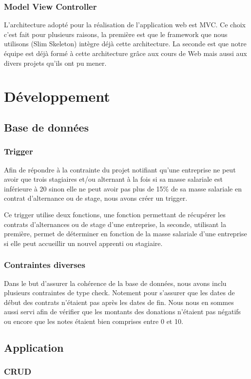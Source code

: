 \documentclass[french,12pt,a4paper,titlepage]{report}
\begin{document}
		\subsection{Model View Controller}
		L'architecture adopté pour la réalisation de l'application web est MVC. Ce choix c'est fait pour plusieurs raisons, la première est que le framework que nous utilisons (Slim Skeleton) intègre déjà cette architecture. La seconde est que notre équipe est déjà formé à cette architecture grâce aux cours de Web mais aussi aux divers projets qu'ils ont pu mener.
	\chapter{Développement}
	\section{Base de données}
	\subsection{Trigger} 
	Afin de répondre à la contrainte du projet notifiant qu'une entreprise ne peut avoir que trois stagiaires et/ou alternant à la fois si sa masse salariale est inférieure à 20 sinon elle ne peut avoir pas plus de 15\% de sa masse salariale en contrat d'alternance ou de stage, nous avons créer un trigger.
	
	Ce trigger utilise deux fonctions, une fonction permettant de récupérer les contrats d'alternances ou de stage d'une entreprise, la seconde, utilisant la première, permet de déterminer en fonction de la masse salariale d'une entreprise si elle peut accueillir un nouvel apprenti ou stagiaire. 
	
	\subsection{Contraintes diverses}
	Dans le but d'assurer la cohérence de la base de données, nous avons inclu plusieurs contraintes de type check. Notement pour s'assurer que les dates de début des contrats n'étaient pas après les dates de fin. Nous nous en sommes aussi servi afin de vérifier que les montants des donations n'étaient pas négatifs ou encore que les notes étaient bien comprises entre 0 et 10.
	 
	\section{Application}
	\subsection{CRUD}
\end{document}
